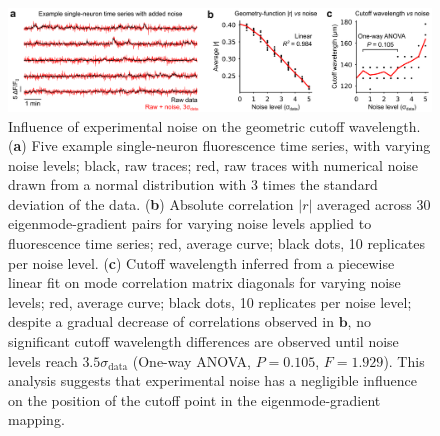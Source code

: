 \documentclass{article}
\begin{document}
\newpage

\begin{figure}[t]
    \centering
    \includegraphics[width=1.0\linewidth]{figures/supp_noise.png}
    \caption{Influence of experimental noise on the geometric cutoff wavelength. (\textbf{a}) Five example single-neuron fluorescence time series, with varying noise levels; black, raw traces; red, raw traces with numerical noise drawn from a normal distribution with 3 times the standard deviation of the data. (\textbf{b}) Absolute correlation $|r|$ averaged across 30 eigenmode-gradient pairs for varying noise levels applied to fluorescence time series; red, average curve; black dots, 10 replicates per noise level. (\textbf{c}) Cutoff wavelength inferred from a piecewise linear fit on mode correlation matrix diagonals for varying noise levels; red, average curve; black dots, 10 replicates per noise level; despite a gradual decrease of correlations observed in $\textbf{b}$, no significant cutoff wavelength differences are observed until noise levels reach $3.5\sigma_{\text{data}}$ (One-way ANOVA, $P=0.105$, $F=1.929$). This analysis suggests that experimental noise has a negligible influence on the position of the cutoff point in the eigenmode-gradient mapping.}
    \label{supp_noise}
\end{figure}

\newpage
\end{document}
